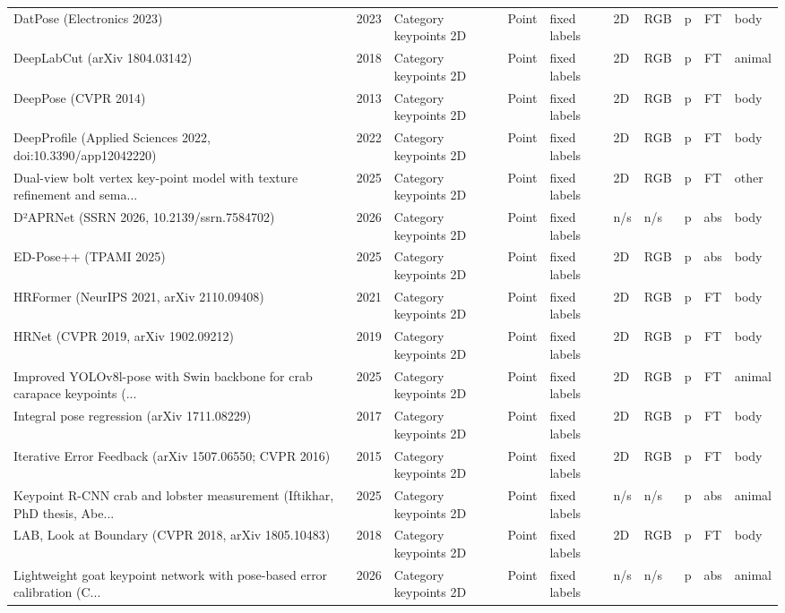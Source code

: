 {\begin{landscape}
\begin{longtable}{@{}p{4.6cm}rp{2.0cm}lllllcl@{}}
DatPose (Electronics 2023) & 2023 & Category keypoints 2D & Point & fixed labels & 2D & RGB & p & FT & body \\
DeepLabCut (arXiv 1804.03142) & 2018 & Category keypoints 2D & Point & fixed labels & 2D & RGB & p & FT & animal \\
DeepPose (CVPR 2014) & 2013 & Category keypoints 2D & Point & fixed labels & 2D & RGB & p & FT & body \\
DeepProfile (Applied Sciences 2022, doi:10.3390/app12042220) & 2022 & Category keypoints 2D & Point & fixed labels & 2D & RGB & p & FT & body \\
Dual-view bolt vertex key-point model with texture refinement and sema... & 2025 & Category keypoints 2D & Point & fixed labels & 2D & RGB & p & FT & other \\
D²APRNet (SSRN 2026, 10.2139/ssrn.7584702) & 2026 & Category keypoints 2D & Point & fixed labels & n/s & n/s & p & abs & body \\
ED-Pose++ (TPAMI 2025) & 2025 & Category keypoints 2D & Point & fixed labels & 2D & RGB & p & abs & body \\
HRFormer (NeurIPS 2021, arXiv 2110.09408) & 2021 & Category keypoints 2D & Point & fixed labels & 2D & RGB & p & FT & body \\
HRNet (CVPR 2019, arXiv 1902.09212) & 2019 & Category keypoints 2D & Point & fixed labels & 2D & RGB & p & FT & body \\
Improved YOLOv8l-pose with Swin backbone for crab carapace keypoints (... & 2025 & Category keypoints 2D & Point & fixed labels & 2D & RGB & p & FT & animal \\
Integral pose regression (arXiv 1711.08229) & 2017 & Category keypoints 2D & Point & fixed labels & 2D & RGB & p & FT & body \\
Iterative Error Feedback (arXiv 1507.06550; CVPR 2016) & 2015 & Category keypoints 2D & Point & fixed labels & 2D & RGB & p & FT & body \\
Keypoint R-CNN crab and lobster measurement (Iftikhar, PhD thesis, Abe... & 2025 & Category keypoints 2D & Point & fixed labels & n/s & n/s & p & abs & animal \\
LAB, Look at Boundary (CVPR 2018, arXiv 1805.10483) & 2018 & Category keypoints 2D & Point & fixed labels & 2D & RGB & p & FT & body \\
Lightweight goat keypoint network with pose-based error calibration (C... & 2026 & Category keypoints 2D & Point & fixed labels & n/s & n/s & p & abs & animal \\

\end{longtable}
\end{landscape}}

